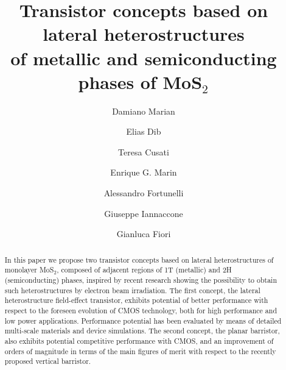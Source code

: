 \documentclass[aps,reprint,superscriptaddress,secnumarabic,amssymb,showpacs]{revtex4-1}
\begin{document}
\title{Transistor concepts based on lateral heterostructures \\ of metallic and semiconducting phases of MoS$_2$}


\author{Damiano Marian}
\author{Elias Dib}
\author{Teresa Cusati}
\author{Enrique G. Marin}
\author{Alessandro Fortunelli}
\author{Giuseppe Iannaccone}
\author{Gianluca Fiori}


\begin{abstract}
In this paper we propose two transistor concepts based on lateral heterostructures of monolayer MoS$_2$, composed of adjacent regions of 1T (metallic) and 2H (semiconducting) phases, inspired by recent research showing the possibility to obtain such heterostructures by electron beam irradiation.
The first concept, the lateral heterostructure field-effect transistor, exhibits potential of better performance with respect to the foreseen evolution of CMOS technology, both for high performance and low power applications. Performance potential has been evaluated by means of detailed multi-scale materials and device simulations. The second concept, the planar barristor, also exhibits potential competitive performance with CMOS, and an improvement of orders of magnitude in terms of the main figures of merit with respect to the recently proposed vertical barristor.
\end{abstract}
\end{document}
